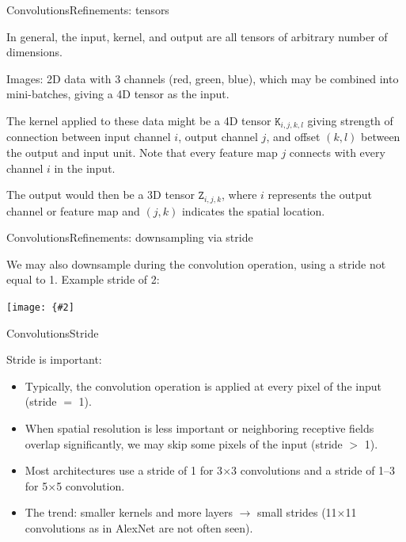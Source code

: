 \documentclass[aspectratio=169]{beamer}
\newcommand{\mat}[1]{\mathtt{#1}}
\newcommand{\myfig}[3]{\centerline{\texttt{[image: \{\#2]}}}
\begin{document}
\begin{frame}{Convolutions}{Refinements: tensors}

In general, the input, kernel, and output are all tensors of arbitrary
number of dimensions.

\medskip

Images: 2D data with 3 channels (red, green, blue), which may be combined
into mini-batches, giving a 4D tensor as the input.

\medskip

The kernel applied to these data might be a 4D tensor $\mat{K}_{i,j,k,l}$ giving
strength of connection between input channel $i$, output channel $j$, and
offset $(k,l)$ between the output and input unit.  Note that every feature
map $j$ connects with \alert{every} channel $i$ in the input.

\medskip

The output would then be a 3D tensor $\mat{Z}_{i,j,k}$, where $i$ represents
the output channel or feature map and $(j,k)$ indicates the spatial location.

\end{frame}


\begin{frame}{Convolutions}{Refinements: downsampling via stride}

We may also \alert{downsample} during the convolution operation, using
a stride not equal to 1. Example stride of 2:

\myfig{1.8in}{goodfellow-fig9-12}{Goodfellow et al. (2016), Figure 9.12}

\end{frame}


\begin{frame}{Convolutions}{Stride}

  Stride is important:
  \begin{itemize}
  \item Typically, the convolution operation is applied at every pixel
    of the input (stride $=$ 1).
  \item When spatial resolution is less important or neighboring
    receptive fields overlap significantly, we may skip some pixels of
    the input (stride $>$ 1).
  \item Most architectures use a stride of 1 for 3$\times$3
    convolutions and a stride of 1--3 for 5$\times$5 convolution.
  \item The trend: smaller kernels and more layers $\rightarrow$ small
    strides (11$\times$11 convolutions as in AlexNet are not often
    seen).
  \end{itemize}
    
\end{frame}
\end{document}
